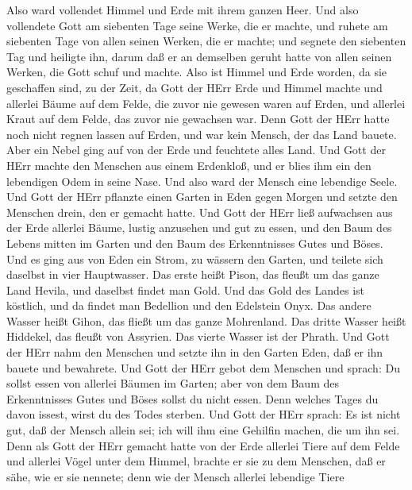  Also ward vollendet Himmel und Erde mit ihrem ganzen Heer.
 Und also vollendete Gott am siebenten Tage seine Werke, die
er machte, und ruhete am siebenten Tage von allen seinen Werken, die er
machte;  und segnete den siebenten Tag und heiligte ihn,
darum daß er an demselben geruht hatte von allen seinen Werken, die Gott
schuf und machte.  Also ist Himmel und Erde worden, da sie
geschaffen sind, zu der Zeit, da Gott der HErr Erde und Himmel machte
 und allerlei Bäume auf dem Felde, die zuvor nie gewesen
waren auf Erden, und allerlei Kraut auf dem Felde, das zuvor nie
gewachsen war. Denn Gott der HErr hatte noch nicht regnen lassen auf
Erden, und war kein Mensch, der das Land bauete.  Aber ein
Nebel ging auf von der Erde und feuchtete alles Land.  Und
Gott der HErr machte den Menschen aus einem Erdenkloß, und er blies ihm
ein den lebendigen Odem in seine Nase. Und also ward der Mensch eine
lebendige Seele.  Und Gott der HErr pflanzte einen Garten in
Eden gegen Morgen und setzte den Menschen drein, den er gemacht hatte.
 Und Gott der HErr ließ aufwachsen aus der Erde allerlei
Bäume, lustig anzusehen und gut zu essen, und den Baum des Lebens mitten
im Garten und den Baum des Erkenntnisses Gutes und Böses. 
Und es ging aus von Eden ein Strom, zu wässern den Garten, und teilete
sich daselbst in vier Hauptwasser.  Das erste heißt Pison,
das fleußt um das ganze Land Hevila, und daselbst findet man Gold.
 Und das Gold des Landes ist köstlich, und da findet man
Bedellion und den Edelstein Onyx.  Das andere Wasser heißt
Gihon, das fließt um das ganze Mohrenland.  Das dritte
Wasser heißt Hiddekel, das fleußt von Assyrien. Das vierte Wasser ist
der Phrath.  Und Gott der HErr nahm den Menschen und setzte
ihn in den Garten Eden, daß er ihn bauete und bewahrete. 
Und Gott der HErr gebot dem Menschen und sprach: Du sollst essen von
allerlei Bäumen im Garten;  aber von dem Baum des
Erkenntnisses Gutes und Böses sollst du nicht essen. Denn welches Tages
du davon issest, wirst du des Todes sterben.  Und Gott der
HErr sprach: Es ist nicht gut, daß der Mensch allein sei; ich will ihm
eine Gehilfin machen, die um ihn sei.  Denn als Gott der
HErr gemacht hatte von der Erde allerlei Tiere auf dem Felde und
allerlei Vögel unter dem Himmel, brachte er sie zu dem Menschen, daß er
sähe, wie er sie nennete; denn wie der Mensch allerlei lebendige Tiere
